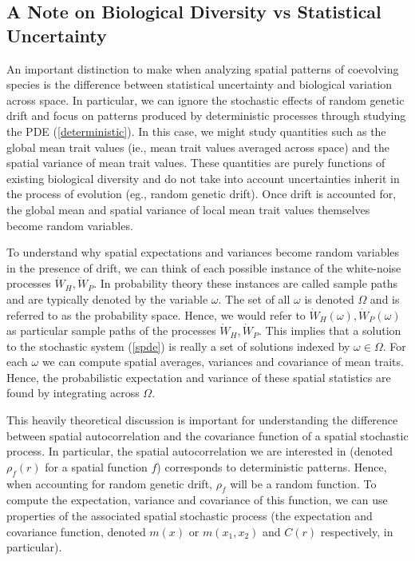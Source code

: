 \documentclass{article}
\begin{document}
\hypertarget{a-note-on-biological-diversity-vs-statistical-uncertainty}{%
\subsection{A Note on Biological Diversity vs Statistical
Uncertainty}\label{a-note-on-biological-diversity-vs-statistical-uncertainty}}

An important distinction to make when analyzing spatial patterns of
coevolving species is the difference between statistical uncertainty and
biological variation across space. In particular, we can ignore the
stochastic effects of random genetic drift and focus on patterns
produced by deterministic processes through studying the PDE
(\ref{deterministic}). In this case, we might study quantities such as
the global mean trait values (ie., mean trait values averaged across
space) and the spatial variance of mean trait values. These quantities
are purely functions of existing biological diversity and do not take
into account uncertainties inherit in the process of evolution (eg.,
random genetic drift). Once drift is accounted for, the global mean and
spatial variance of local mean trait values themselves become random
variables.

To understand why spatial expectations and variances become random
variables in the presence of drift, we can think of each possible
instance of the white-noise processes \(\dot W_H,\dot W_P\). In
probability theory these instances are called sample paths and are
typically denoted by the variable \(\omega\). The set of all \(\omega\)
is denoted \(\Omega\) and is referred to as the probability space.
Hence, we would refer to \(\dot W_H(\omega),\dot W_P(\omega)\) as
particular sample paths of the processes \(\dot W_H,\dot W_P\). This
implies that a solution to the stochastic system (\ref{spde}) is really
a set of solutions indexed by \(\omega\in\Omega\). For each \(\omega\)
we can compute spatial averages, variances and covariance of mean
traits. Hence, the probabilistic expectation and variance of these
spatial statistics are found by integrating across \(\Omega\).

This heavily theoretical discussion is important for understanding the
difference between spatial autocorrelation and the covariance function
of a spatial stochastic process. In particular, the spatial
autocorrelation we are interested in (denoted \(\rho_f(r)\) for a
spatial function \(f\)) corresponds to deterministic patterns. Hence,
when accounting for random genetic drift, \(\rho_f\) will be a random
function. To compute the expectation, variance and covariance of this
function, we can use properties of the associated spatial stochastic
process (the expectation and covariance function, denoted \(m(x)\) or
\(m(x_1,x_2)\) and \(C(r)\) respectively, in particular).
\end{document}
